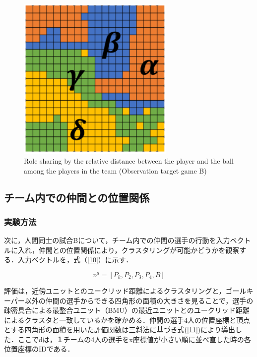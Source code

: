 \begin{figure}[htb]
  \begin{center}
    \includegraphics[clip,height=8.0cm]{figure/Role_sharing_by_the_relative_distance_between_the_player_and_the_ball_among_the_players_in_the_team_Observation_target_game_B.eps}
    \caption{Role sharing by the relative distance between the player and the ball among the players in the team (Observation target game B)}
    \label{fig:SOM_result04}
  \end{center}
\end{figure}

\clearpage%


\subsection{チーム内での仲間との位置関係}

\subsubsection{実験方法}
次に，人間同士の試合Bについて，チーム内での仲間の選手の行動を入力ベクトルに入れ，仲間との位置関係により，クラスタリングが可能かどうかを観察する．入力ベクトルを，式（\ref{10}）に示す．

\begin{equation}
	\label{10}
	v^{\mu} = [P_k, P_2, P_3, P_4, B]
\end{equation}

評価は，近傍ユニットとのユークリッド距離によるクラスタリングと，ゴールキーパー以外の仲間の選手からできる四角形の面積の大きさを見ることで，選手の疎密具合による最整合ユニット（BMU）の最近ユニットとのユークリッド距離によるクラスタと一致しているかを確かめる．仲間の選手4人の位置座標と頂点とする四角形の面積を用いた評価関数は三斜法に基づき式(\ref{11})により導出した．ここでdは，１チームの4人の選手をx座標値が小さい順に並べ直した時の各位置座標のIDである．

